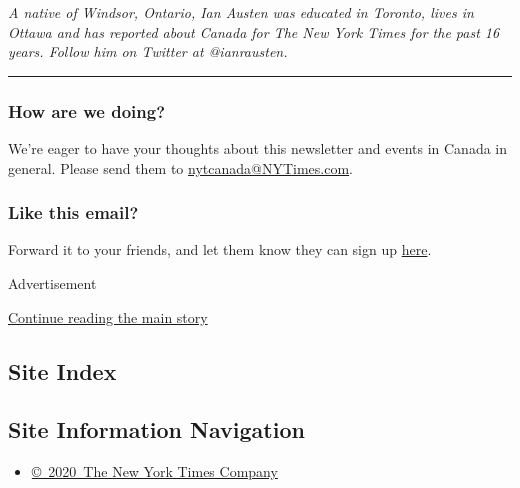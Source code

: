 \emph{A native of Windsor, Ontario, Ian Austen was educated in Toronto,
lives in Ottawa and has reported about Canada for The New York Times for
the past 16 years. Follow him on Twitter at @ianrausten.}

\begin{center}\rule{0.5\linewidth}{\linethickness}\end{center}

\hypertarget{how-are-we-doing}{%
\subsubsection{\texorpdfstring{\textbf{How are we
doing?}}{How are we doing?}}\label{how-are-we-doing}}

We're eager to have your thoughts about this newsletter and events in
Canada in general. Please send them to
\href{mailto:nytcanada@NYTimes.com?\%20subject=Canada\%20Letter\%20Newsletter\%20Feedback}{nytcanada@NYTimes.com}.

\hypertarget{like-this-email}{%
\subsubsection{\texorpdfstring{\textbf{Like this
email?}}{Like this email?}}\label{like-this-email}}

Forward it to your friends, and let them know they can sign up
\href{https://www.nytimes3xbfgragh.onion/newsletters/canada-letter?smid=nytemail\&smvar=canadaletter\&te=1\&nl=canada-today\&emc=edit_cnda_20190622}{here}.

Advertisement

\protect\hyperlink{after-bottom}{Continue reading the main story}

\hypertarget{site-index}{%
\subsection{Site Index}\label{site-index}}

\hypertarget{site-information-navigation}{%
\subsection{Site Information
Navigation}\label{site-information-navigation}}

\begin{itemize}
\tightlist
\item
  \href{https://help.nytimes3xbfgragh.onion/hc/en-us/articles/115014792127-Copyright-notice}{©~2020~The
  New York Times Company}
\end{itemize}

